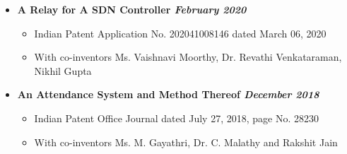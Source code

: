\documentclass[9]{Resume}
\begin{document}
\begin{itemize}[noitemsep,nolistsep]
	\item[]\textbf{A Relay for A SDN Controller \hfill \textit{February 2020}}
		\begin{itemize}[leftmargin=*]
			\setlength\itemsep{-0.25em}
			\item[\textbullet]Indian Patent Application No. 202041008146 dated March 06, 2020
			\item[\textbullet]With co-inventors Ms. Vaishnavi Moorthy, Dr. Revathi Venkataraman, Nikhil Gupta
		\end{itemize}
	\item[]\textbf{An Attendance System and Method Thereof \hfill \textit{December 2018}}
		\begin{itemize}[leftmargin=*]
			\setlength\itemsep{-0.25em}
			\item[\textbullet]Indian Patent Office Journal dated July 27, 2018, page No. 28230
			\item[\textbullet]With co-inventors Ms. M. Gayathri, Dr. C. Malathy and Rakshit Jain
		\end{itemize}
\end{itemize}
\end{document}
